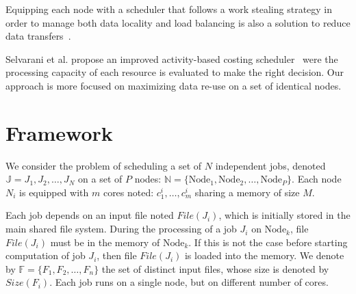 \documentclass[conference,10pt]{IEEEtran}
\newcommand{\Node}[1]{\ensuremath{\mathrm{Node}_{#1}}\xspace}
\newcommand{\file}{\ensuremath{\mathit{File}}\xspace}
\newcommand{\size}{\ensuremath{\mathit{Size}}\xspace}
\newcommand{\fileset}{\ensuremath{\mathbb{F}}\xspace}
\newcommand{\jobset}{\ensuremath{\mathbb{J}}\xspace}
\newcommand{\nodeset}{\ensuremath{\mathbb{N}}\xspace}
\begin{document}
Equipping each node with a scheduler that follows a work
stealing strategy in order to manage both data locality 
and load balancing is also a solution to reduce data transfers~\cite{Optimizing_load_balancing_and_data_locality_with_data_aware_scheduling}.

Selvarani et al. propose an improved activity-based costing scheduler~\cite{Improved_cost_based_algorithm}
were the processing capacity of each resource is evaluated to make the right decision.
Our approach is more focused on maximizing data re-use on a 
set of identical nodes.


\section{Framework}\label{sec.framework}

We consider the problem of scheduling a set of $N$ independent jobs,
denoted $\jobset = {J_1, J_2, \ldots, J_N}$ on a set of $P$ nodes:
$\nodeset = \{\Node{1}, \Node{2}, \ldots, \Node{P}\}$.
Each node $N_i$ is equipped with $m$ cores noted:
$c^i_1,\ldots,c^i_m$ sharing a memory of size $M$.

Each job depends on an input file noted $\file(J_i)$, which is
initially stored in the main shared file system.  During the
processing of a job $J_i$ on $\Node{k}$, file $\file(J_i)$ must be in
the memory of $\Node{k}$. If this is not the case before starting
computation of job $J_i$, then file $\file(J_i)$ is loaded into the
memory.  We denote by $\fileset = \{F_1, F_2, \ldots, F_n\}$ the set
of distinct input files, whose size is denoted by $\size(F_i)$. Each
job runs on a single node, but on different number of cores.
\end{document}
